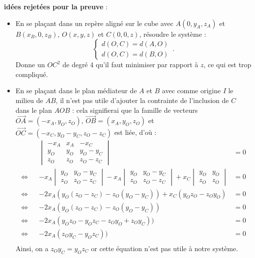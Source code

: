 \documentclass{article}
\begin{document}
\textbf{idées rejetées pour la preuve } :
\begin{itemize}
    \item En se plaçant dans un repère aligné sur le cube avec $A(0, y_A, z_A)$ et $B(x_B, 0, z_B)$, $O(x, y, z)$ et $C(0, 0, z)$, résoudre le système :
\begin{equation}
    \begin{cases}
      d(O, C) = d(A, O)\\
      d(O, C) = d(B, O)
    \end{cases}\,.
\end{equation}
Donne un $OC^2$ de degré 4 qu'il faut minimiser par rapport à $z$, ce qui est trop compliqué.
    \item En se plaçant dans le plan médiateur de $A$ et $B$ avec comme origine $I$ le milieu de $AB$, il n'est pas utile d'ajouter la contrainte de l'inclusion de $C$ dans le plan $AOB$ : cela signifierai que la famille de vecteurs $\overrightarrow{OA} = (-x_A, y_O, z_O)$, $\overrightarrow{OB} = (x_A, y_O, z_O)$ et $\overrightarrow{OC} = (- x_C, y_O - y_C, z_O - z_C)$ est liée, d'où :
    \begin{align*}
        &&                 \begin{vmatrix}
                          -x_A & x_A & -x_C\\
                           y_O  & y_O & y_O - y_C\\
                           z_O  & z_O & z_O - z_C
                           \end{vmatrix} &= 0\\
        \Leftrightarrow && -x_A \begin{vmatrix}y_O & y_O - y_C\\z_O & z_O - z_C\end{vmatrix} - x_A \begin{vmatrix}y_O & y_O - y_C\\z_O & z_O - z_C\end{vmatrix} + x_C \begin{vmatrix}y_O & y_O\\z_O & z_O\end{vmatrix} &= 0\\
        \Leftrightarrow && -2x_A(y_O(z_O - z_C) - z_O(y_O - y_C)) + x_C(y_Oz_O - z_Oy_O) &= 0\\
        \Leftrightarrow && -2x_A(y_O(z_O - z_C) - z_O(y_O - y_C)) &= 0\\
        \Leftrightarrow && -2x_A(y_Oz_O - y_Oz_C - z_Oy_O + z_Oy_C)) &= 0\\
        \Leftrightarrow && -2x_A(z_Oy_C - y_Oz_C)) &= 0\\
    \end{align*}
    Ainsi, on a $\boxed{z_Oy_C = y_Oz_C}$ or cette équation n'est pas utile à notre système.


\end{itemize}
\end{document}
